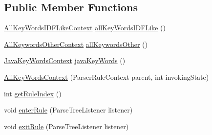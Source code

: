 \subsection*{Public Member Functions}
\begin{DoxyCompactItemize}
\item 
\hyperlink{classgov_1_1nasa_1_1jpf_1_1inspector_1_1server_1_1expression_1_1parser_1_1_expression_grammar_pad664d42a2aee14226e172b869b9ffb3b}{All\+Key\+Words\+I\+D\+F\+Like\+Context} \hyperlink{classgov_1_1nasa_1_1jpf_1_1inspector_1_1server_1_1expression_1_1parser_1_1_expression_grammar_parser_1_1_all_key_words_context_a2e6032b87e9bd3f2ca2b5d299c6a9b51}{all\+Key\+Words\+I\+D\+F\+Like} ()
\item 
\hyperlink{classgov_1_1nasa_1_1jpf_1_1inspector_1_1server_1_1expression_1_1parser_1_1_expression_grammar_pacb3381aaee949f84c436ba6b73657885}{All\+Keywords\+Other\+Context} \hyperlink{classgov_1_1nasa_1_1jpf_1_1inspector_1_1server_1_1expression_1_1parser_1_1_expression_grammar_parser_1_1_all_key_words_context_ad35693a029f586c9bf9075d2d1bb19ea}{all\+Keywords\+Other} ()
\item 
\hyperlink{classgov_1_1nasa_1_1jpf_1_1inspector_1_1server_1_1expression_1_1parser_1_1_expression_grammar_parser_1_1_java_key_words_context}{Java\+Key\+Words\+Context} \hyperlink{classgov_1_1nasa_1_1jpf_1_1inspector_1_1server_1_1expression_1_1parser_1_1_expression_grammar_parser_1_1_all_key_words_context_a9cd61f258267aa0a3c2afa014eb4c0ed}{java\+Key\+Words} ()
\item 
\hyperlink{classgov_1_1nasa_1_1jpf_1_1inspector_1_1server_1_1expression_1_1parser_1_1_expression_grammar_parser_1_1_all_key_words_context_a3d93a77cd42726488f033c2f592608b0}{All\+Key\+Words\+Context} (Parser\+Rule\+Context parent, int invoking\+State)
\item 
int \hyperlink{classgov_1_1nasa_1_1jpf_1_1inspector_1_1server_1_1expression_1_1parser_1_1_expression_grammar_parser_1_1_all_key_words_context_a7db015715b0efc9a6b286d4e7b36ea4f}{get\+Rule\+Index} ()
\item 
void \hyperlink{classgov_1_1nasa_1_1jpf_1_1inspector_1_1server_1_1expression_1_1parser_1_1_expression_grammar_parser_1_1_all_key_words_context_a148f3d6fc032c31a8ce5cb209e8e35b8}{enter\+Rule} (Parse\+Tree\+Listener listener)
\item 
void \hyperlink{classgov_1_1nasa_1_1jpf_1_1inspector_1_1server_1_1expression_1_1parser_1_1_expression_grammar_parser_1_1_all_key_words_context_ac368a83bc1128aa7adde05cccafe31db}{exit\+Rule} (Parse\+Tree\+Listener listener)
\end{DoxyCompactItemize}
